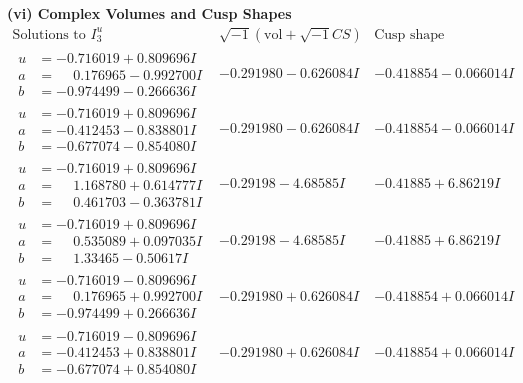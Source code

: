 \documentclass[1p]{elsarticle_modified}
\theoremstyle{definition}
\newcommand{\I}{\sqrt{-1}}
\begin{document}
\newpage\flushleft \textbf{(vi) Complex Volumes and Cusp Shapes}
$$\begin{array}{c|c|c}  
\text{Solutions to }I^u_{3}& \I (\text{vol} + \sqrt{-1}CS) & \text{Cusp shape}\\
 \hline 
\begin{aligned}
u &= -0.716019 + 0.809696 I \\
a &= \phantom{-}0.176965 - 0.992700 I \\
b &= -0.974499 - 0.266636 I\end{aligned}
 & -0.291980 - 0.626084 I & -0.418854 - 0.066014 I \\ \hline\begin{aligned}
u &= -0.716019 + 0.809696 I \\
a &= -0.412453 - 0.838801 I \\
b &= -0.677074 - 0.854080 I\end{aligned}
 & -0.291980 - 0.626084 I & -0.418854 - 0.066014 I \\ \hline\begin{aligned}
u &= -0.716019 + 0.809696 I \\
a &= \phantom{-}1.168780 + 0.614777 I \\
b &= \phantom{-}0.461703 - 0.363781 I\end{aligned}
 & -0.29198 - 4.68585 I & -0.41885 + 6.86219 I \\ \hline\begin{aligned}
u &= -0.716019 + 0.809696 I \\
a &= \phantom{-}0.535089 + 0.097035 I \\
b &= \phantom{-}1.33465 - 0.50617 I\end{aligned}
 & -0.29198 - 4.68585 I & -0.41885 + 6.86219 I \\ \hline\begin{aligned}
u &= -0.716019 - 0.809696 I \\
a &= \phantom{-}0.176965 + 0.992700 I \\
b &= -0.974499 + 0.266636 I\end{aligned}
 & -0.291980 + 0.626084 I & -0.418854 + 0.066014 I \\ \hline\begin{aligned}
u &= -0.716019 - 0.809696 I \\
a &= -0.412453 + 0.838801 I \\
b &= -0.677074 + 0.854080 I\end{aligned}
 & -0.291980 + 0.626084 I & -0.418854 + 0.066014 I \\ \hline\begin{aligned}

\end{aligned}
\end{array}$$
\end{document}
